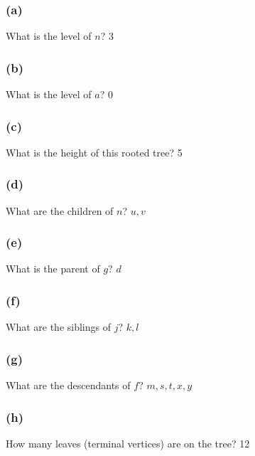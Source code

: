 \documentclass[14pt]{extarticle}
\begin{document}
\subsubsection{(a)}
What is the level of \(n\)? \hspace{2cm}{\it Proof.} 3 

\subsubsection{(b)}
What is the level of \(a\)? \hspace{2cm}{\it Proof.} 0

\subsubsection{(c)}
What is the height of this rooted tree? \hspace{2cm}{\it Proof.} 5

\subsubsection{(d)}
What are the children of \(n\)?
\hspace{2cm}{\it Proof.} \(u, v\)

\subsubsection{(e)}
What is the parent of \(g\)? \hspace{2cm}{\it Proof.}\(d\)


\subsubsection{(f)}
What are the siblings of \(j\)? 
\hspace{2cm}{\it Proof.} \(k, l\)

\subsubsection{(g)}
What are the descendants of \(f\)?
\hspace{2cm}{\it Proof.} \(m, s, t, x, y\)


\subsubsection{(h)}
How many leaves (terminal vertices) are on the tree?
\hspace{2cm}{\it Proof.} 12
\end{document}
